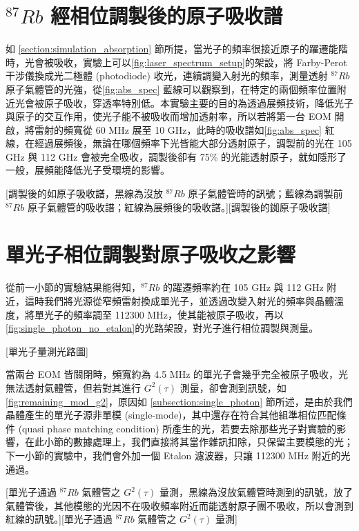 \documentclass[class=NCU_thesis, crop=false]{standalone}
\begin{document}
\section{$^{87}Rb$ 經相位調製後的原子吸收譜}

如 \ref{section:simulation_absorption} 節所提，當光子的頻率很接近原子的躍遷能階時，光會被吸收，實驗上可以\cref{fig:laser_spectrum_setup}的架設，將 Farby-Perot 干涉儀換成光二極體 (photodiode) 收光，連續調變入射光的頻率，測量透射 $^{87}Rb$ 原子氣體管的光強，從\cref{fig:abs_spec} 藍線可以觀察到，在特定的兩個頻率位置附近光會被原子吸收，穿透率特別低。本實驗主要的目的為透過展頻技術，降低光子與原子的交互作用，使光子能不被吸收而增加透射率，所以若將第一台 EOM 開啟，將雷射的頻寬從 60 MHz 展至 10 GHz，此時的吸收譜如\cref{fig:abs_spec} 紅線，在經過展頻後，無論在哪個頻率下光皆能大部分透射原子，調製前的光在 105 GHz 與 112 GHz 會被完全吸收，調製後卻有 75\% 的光能透射原子，就如隱形了一般，展頻能降低光子受環境的影響。

[調製後的如原子吸收譜，黑線為沒放 $^{87}Rb$ 原子氣體管時的訊號；藍線為調製前 $^{87}Rb$ 原子氣體管的吸收譜；紅線為展頻後的吸收譜。][調製後的銣原子吸收譜]

\section{單光子相位調製對原子吸收之影響}
從前一小節的實驗結果能得知，$^{87}Rb$ 的躍遷頻率約在 105 GHz 與 112 GHz 附近，這時我們將光源從窄頻雷射換成單光子，並透過改變入射光的頻率與晶體溫度，將單光子的頻率調至 112300 MHz，使其能被原子吸收，再以\cref{fig:single_photon_no_etalon}的光路架設，對光子進行相位調製與測量。

[單光子量測光路圖]

當兩台 EOM 皆關閉時，頻寬約為 4.5 MHz 的單光子會幾乎完全被原子吸收，光無法透射氣體管，但若對其進行 $G^{2}(\tau)$ 測量，卻會測到訊號，如\cref{fig:remaining_mod_g2}，原因如 \ref{subsection:single_photon} 節所述，是由於我們晶體產生的單光子源非單模 (single-mode)，其中還存在符合其他組準相位匹配條件 (quasi phase matching condition) 所產生的光，若要去除那些光子對實驗的影響，在此小節的數據處理上，我們直接將其當作雜訊扣除，只保留主要模態的光；下一小節的實驗中，我們會外加一個 Etalon 濾波器，只讓 112300 MHz 附近的光通過。

[單光子通過 $^{87}Rb$ 氣體管之 $G^{2}(\tau)$ 量測，黑線為沒放氣體管時測到的訊號，放了氣體管後，其他模態的光因不在吸收頻率附近而能透射原子團不吸收，所以會測到紅線的訊號。][單光子通過 $^{87}Rb$ 氣體管之 $G^{2}(\tau)$ 量測]
\end{document}
